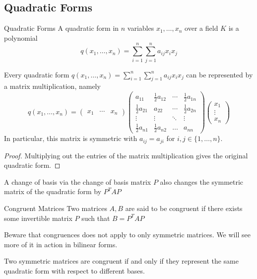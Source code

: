 \subsection{Quadratic Forms}
\begin{defn}{Quadratic Forms}{} A quadratic form in $n$ variables $x_1,\dots,x_n$ over a field $K$ is a polynomial $$q(x_1,\dots,x_n)=\sum_{i=1}^n\sum_{j=1}^na_{ij}x_ix_j$$
\end{defn}

\begin{prp}{}{} Every quadratic form $q(x_1,\dots,x_n)=\sum_{i=1}^n\sum_{j=1}^na_{ij}x_ix_j$ can be represented by a matrix multiplication, namely $$q(x_1,\dots,x_n)=\begin{pmatrix}x_1 & \cdots & x_n\end{pmatrix}\begin{pmatrix}a_{11} & \frac{1}{2}a_{12} & \cdots & \frac{1}{2}a_{1n}\\
\frac{1}{2}a_{21} & a_{22} & \cdots & \frac{1}{2}a_{2n}\\
\vdots & \vdots & \ddots & \vdots\\
\frac{1}{2}a_{n1} & \frac{1}{2}a_{n2} & \dots & a_{nn}
\end{pmatrix}\begin{pmatrix}x_1 \\ \vdots \\ x_n\end{pmatrix}$$ In particular, this matrix is symmetric with $a_{ij}=a_{ji}$ for $i,j\in\{1,\dots,n\}$. \tcbline
\begin{proof}
Multiplying out the entries of the matrix multiplication gives the original quadratic form. 
\end{proof}
\end{prp}

\begin{prp}{}{} A change of basis via the change of basis matrix $P$ also changes the symmetric matrix of the quadratic form by $P^TAP$
\end{prp}

\begin{defn}{Congruent Matrices}{} Two matrices $A,B$ are said to be congruent if there exists some invertible matrix $P$ such that $B=P^TAP$
\end{defn}

Beware that congruences does not apply to only symmetric matrices. We will see more of it in action in bilinear forms. 

\begin{prp}{}{} Two symmetric matrices are congruent if and only if they represent the same quadratic form with respect to different bases. 
\end{prp}

